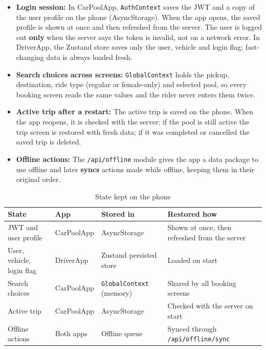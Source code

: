 \begin{itemize}
  \item \textbf{Login session:} In CarPoolApp, \texttt{AuthContext} saves the
        JWT and a copy of the user profile on the phone (AsyncStorage). When
        the app opens, the saved profile is shown at once and then refreshed
        from the server. The user is logged out \textbf{only} when the server
        says the token is invalid, not on a network error. In DriverApp, the
        Zustand store saves only the user, vehicle and login flag;
        fast-changing data is always loaded fresh.
  \item \textbf{Search choices across screens:} \texttt{GlobalContext} holds
        the pickup, destination, ride type (regular or female-only) and
        selected pool, so every booking screen reads the same values and the
        rider never enters them twice.
  \item \textbf{Active trip after a restart:} The active trip is saved on the
        phone. When the app reopens, it is checked with the server: if the pool
        is still active the trip screen is restored with fresh data; if it was
        completed or cancelled the saved trip is deleted.
  \item \textbf{Offline actions:} The \texttt{/api/offline} module gives the
        app a data package to use offline and later \textbf{syncs} actions made
        while offline, keeping them in their original order.
\end{itemize}

\begin{table}[H]
  \centering
  \small
  \caption{State kept on the phone}
  \label{tab:phone-state}
  \begin{tabularx}{\textwidth}{@{}LlLL@{}}
    \toprule
    \textbf{State} & \textbf{App} & \textbf{Stored in} & \textbf{Restored how} \\
    \midrule
    JWT and user profile      & CarPoolApp & AsyncStorage & Shown at once, then refreshed from the server \\
    User, vehicle, login flag & DriverApp  & Zustand persisted store & Loaded on start \\
    Search choices            & CarPoolApp & \texttt{GlobalContext} (memory) & Shared by all booking screens \\
    Active trip               & CarPoolApp & AsyncStorage & Checked with the server on start \\
    Offline actions           & Both apps  & Offline queue & Synced through \texttt{/api/offline/sync} \\
    \bottomrule
  \end{tabularx}
\end{table}

